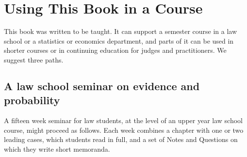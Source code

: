 \chapter{Using This Book in a Course}
\label{app:teaching}

This book was written to be taught. It can support a semester course in a law school or a statistics or economics department, and parts of it can be used in shorter courses or in continuing education for judges and practitioners. We suggest three paths.

\section{A law school seminar on evidence and probability}

A fifteen week seminar for law students, at the level of an upper year law school course, might proceed as follows. Each week combines a chapter with one or two leading cases, which students read in full, and a set of Notes and Questions on which they write short memoranda.
